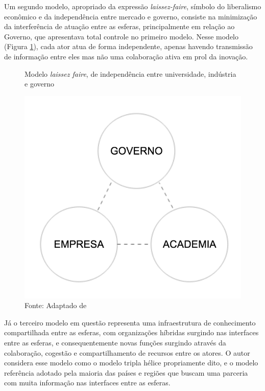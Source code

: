 Um segundo modelo, apropriado da expressão \textit{laissez-faire}, símbolo do liberalismo econômico e da independência entre mercado e governo, consiste na minimização da interferência de atuação entre as esferas, principalmente em relação ao Governo, que apresentava total controle no primeiro modelo. Nesse modelo (Figura \ref{fig:triplehelix2}), cada ator atua de forma independente, apenas havendo transmissão de informação entre eles mas não uma colaboração ativa em prol da inovação.

\begin{figure}[H]
\caption{Modelo \textit{laissez faire}, de independência entre universidade, indústria e governo}
\centerline{\includegraphics[scale=0.5]{img/triplehelix2}}
\label{fig:triplehelix2}
\caption* {Fonte: Adaptado de }
\end{figure}

Já o terceiro modelo em questão representa uma infraestrutura de conhecimento compartilhada entre as esferas, com organizações híbridas surgindo nas interfaces entre as esferas, e consequentemente novas funções surgindo através da colaboração, cogestão e compartilhamento de recursos entre os atores. O autor considera esse modelo como o modelo tripla hélice propriamente dito, e o modelo referência adotado pela maioria das países e regiões que buscam uma parceria com muita informação nas interfaces entre as esferas. 


